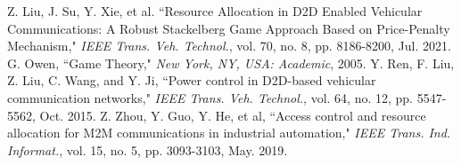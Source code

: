 \documentclass[openany]{YSUthesis}
\begin{document}
\begin{thebibliography}{0}
Z. Liu, J. Su, Y. Xie, et al. ``Resource Allocation in D2D Enabled Vehicular Communications: A Robust Stackelberg Game Approach Based on Price-Penalty Mechanism," \emph{IEEE Trans. Veh. Technol.}, vol. 70, no. 8, pp. 8186-8200, Jul. 2021.
G. Owen, ``Game Theory," \emph{New York, NY, USA: Academic}, 2005.
Y. Ren, F. Liu, Z. Liu, C. Wang, and Y. Ji, ``Power control in D2D-based vehicular communication networks," \emph{IEEE Trans. Veh. Technol.}, vol. 64, no. 12, pp. 5547-5562, Oct. 2015.
Z. Zhou, Y. Guo, Y. He, et al, ``Access control and resource allocation for M2M communications in industrial automation," \emph{IEEE Trans. Ind. Informat.}, vol. 15, no. 5, pp. 3093-3103, May. 2019.
\end{thebibliography}
\end{document}

